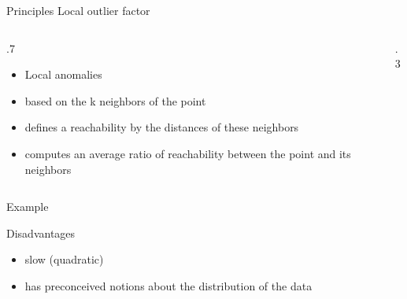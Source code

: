 \begin{frame}{Principles}
  Local outlier factor
  \begin{columns}
    \begin{column}{.7\tw}
      \begin{itemize}
        \item Local anomalies
        \item based on the k neighbors of the point
        \item defines a reachability by the distances of these neighbors
        \item computes an average ratio of reachability between the point and its neighbors
      \end{itemize}
    \end{column}
    \begin{column}{.3\tw}
    \end{column}
  \end{columns}

\end{frame}

\begin{frame}{Example}
\end{frame}

\begin{frame}{Disadvantages}
  \begin{itemize}
  \item slow (quadratic)
  \item has preconceived notions about the distribution of the data
  \end{itemize}
\end{frame}
